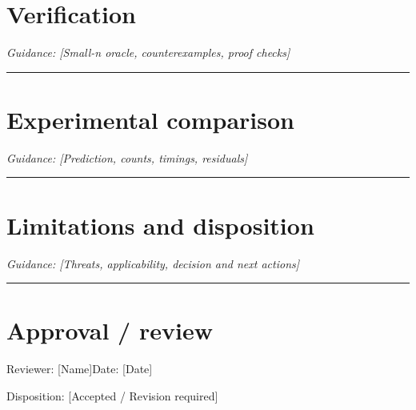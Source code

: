 \documentclass[11pt]{article}
\begin{document}
\section{Verification}
\noindent\textit{Guidance: [Small-n oracle, counterexamples, proof checks]}\par\vspace{0.9cm}\hrule\vspace{0.25cm}
\section{Experimental comparison}
\noindent\textit{Guidance: [Prediction, counts, timings, residuals]}\par\vspace{0.9cm}\hrule\vspace{0.25cm}
\section{Limitations and disposition}
\noindent\textit{Guidance: [Threats, applicability, decision and next actions]}\par\vspace{0.9cm}\hrule\vspace{0.25cm}
\section{Approval / review}
\noindent Reviewer: [Name]\quad Date: [Date]\par
\noindent Disposition: [Accepted / Revision required]\par\vspace{0.4cm}
\end{document}
